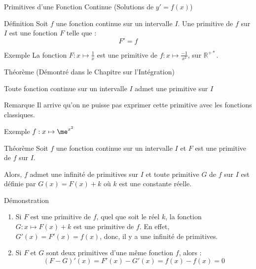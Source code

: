 \documentclass{cours}
\begin{document}
    \begin{Gpartie}{Primitives d'une Fonction Continue \big(Solutions de $y'=f(x)$\big)} 
        \begin{Spartie}{Définition} 
            Soit $f$ une fonction continue sur un intervalle $I$. Une primitive de $f$ sur $I$ est une fonction $F$ telle que :
            \[F'=f\]
        \end{Spartie}
        \begin{Spartie}{Exemple} 
            La fonction $F:x\mapsto\frac{1}{x}$ est une primitive de $f:x\mapsto\frac{-1}{x^2}$, sur $\mathbb{R^{+*}}$.
        \end{Spartie}
        \begin{Spartie}{Théorème} 
            (Démontré dans le Chapitre sur l'Intégration)

            Toute fonction continue sur un intervalle $I$ admet une primitive sur $I$
        \end{Spartie}
        \begin{Spartie}{Remarque} 
            Il arrive qu'on ne puisse pas exprimer cette primitive avec les fonctions classiques.
            \begin{SSpartie}{Exemple} 
                $f:x\mapsto \me^{x^2}$
            \end{SSpartie}
        \end{Spartie}
        \begin{Spartie}{Théorème} 
            Soit $f$ une fonction continue sur un intervalle $I$ et $F$ est une primitive de $f$ sur $I$.

            Alors, $f$ admet une infinité de primitives sur $I$\textsuperscript{\raisebox{.5pt}{\textcircled{\raisebox{-.9pt}{1}}}} et toute primitive $G$ de $f$ sur $I$ est définie par $G(x)=F(x)+k$\textsuperscript{\raisebox{.5pt}{\textcircled{\raisebox{-.9pt}{2}}}} où $k$ est une constante réelle.

            \begin{SSpartie}{Démonstration} 
                \begin{enumerate}
                    \item Si $F$ est une primitive de $f$, quel que soit le réel $k$, la fonction $G:x\mapsto F(x)+k$ est une primitive de $f$. En effet, $G'(x)=F'(x)=f(x)$, donc, il y a une infinité de primitives.
                    \item Si $F$ et $G$ sont deux primitives d'une même fonction $f$, alors :
                    \[(F-G)'(x)=F'(x)-G'(x)=f(x)-f(x)=0\]
    

\end{enumerate}
\end{SSpartie}
\end{Spartie}
\end{Gpartie}
\end{document}

